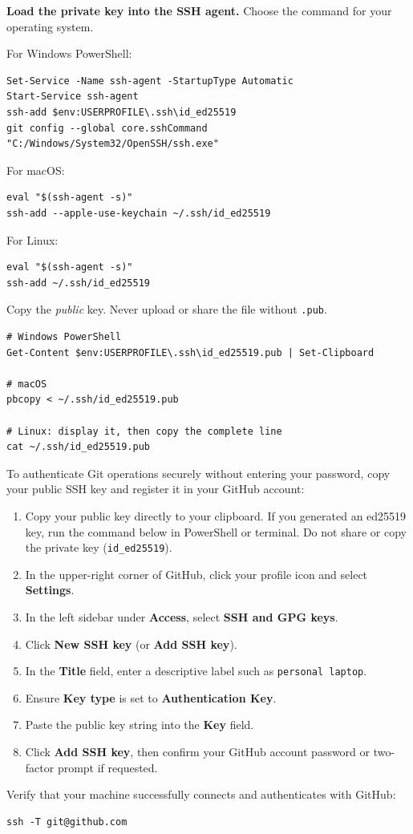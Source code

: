 \pagebreak
\noindent\textbf{Load the private key into the SSH agent.} Choose the command for your operating system.

For Windows PowerShell:

\begin{lstlisting}[style=utpterminal]
Set-Service -Name ssh-agent -StartupType Automatic
Start-Service ssh-agent
ssh-add $env:USERPROFILE\.ssh\id_ed25519
git config --global core.sshCommand "C:/Windows/System32/OpenSSH/ssh.exe"
\end{lstlisting}

For macOS:
\begin{lstlisting}[style=utpterminal]
eval "$(ssh-agent -s)"
ssh-add --apple-use-keychain ~/.ssh/id_ed25519
\end{lstlisting}

For Linux:
\begin{lstlisting}[style=utpterminal]
eval "$(ssh-agent -s)"
ssh-add ~/.ssh/id_ed25519
\end{lstlisting}

Copy the \emph{public} key. Never upload or share the file without
\texttt{.pub}.

\begin{lstlisting}[style=utpterminal]
# Windows PowerShell
Get-Content $env:USERPROFILE\.ssh\id_ed25519.pub | Set-Clipboard

# macOS
pbcopy < ~/.ssh/id_ed25519.pub

# Linux: display it, then copy the complete line
cat ~/.ssh/id_ed25519.pub
\end{lstlisting}

\noindent To authenticate Git operations securely without entering your password, copy your public SSH key and register it in your GitHub account:

\begin{enumerate}[leftmargin=1.7em]
  \item Copy your public key directly to your clipboard. If you generated an ed25519 key, run the command below in PowerShell or terminal. Do not share or copy the private key (\texttt{id\_ed25519}).
  \item In the upper-right corner of GitHub, click your profile icon and select \textbf{Settings}.
  \item In the left sidebar under \textbf{Access}, select \textbf{SSH and GPG keys}.
  \item Click \textbf{New SSH key} (or \textbf{Add SSH key}).
  \item In the \textbf{Title} field, enter a descriptive label such as \texttt{personal laptop}.
  \item Ensure \textbf{Key type} is set to \textbf{Authentication Key}.
  \item Paste the public key string into the \textbf{Key} field.
  \item Click \textbf{Add SSH key}, then confirm your GitHub account password or two-factor prompt if requested.
\end{enumerate}

\noindent Verify that your machine successfully connects and authenticates with GitHub:

\begin{lstlisting}[style=utpterminal]
ssh -T git@github.com
\end{lstlisting}
